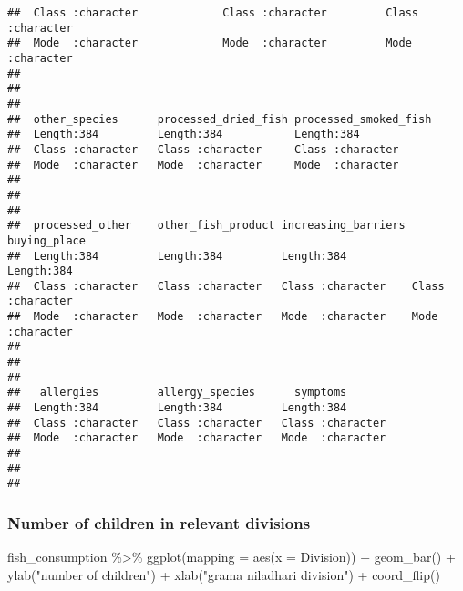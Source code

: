 \documentclass[
]{article}
\newenvironment{Shaded}{\begin{snugshade}}{\end{snugshade}}
\newcommand{\AttributeTok}[1]{\textcolor[rgb]{0.77,0.63,0.00}{#1}}
\newcommand{\FunctionTok}[1]{\textcolor[rgb]{0.00,0.00,0.00}{#1}}
\newcommand{\NormalTok}[1]{#1}
\newcommand{\SpecialCharTok}[1]{\textcolor[rgb]{0.00,0.00,0.00}{#1}}
\newcommand{\StringTok}[1]{\textcolor[rgb]{0.31,0.60,0.02}{#1}}
\begin{document}
\begin{verbatim}
##  Class :character             Class :character         Class :character     
##  Mode  :character             Mode  :character         Mode  :character     
##                                                                             
##                                                                             
##                                                                             
##  other_species      processed_dried_fish processed_smoked_fish
##  Length:384         Length:384           Length:384           
##  Class :character   Class :character     Class :character     
##  Mode  :character   Mode  :character     Mode  :character     
##                                                               
##                                                               
##                                                               
##  processed_other    other_fish_product increasing_barriers buying_place      
##  Length:384         Length:384         Length:384          Length:384        
##  Class :character   Class :character   Class :character    Class :character  
##  Mode  :character   Mode  :character   Mode  :character    Mode  :character  
##                                                                              
##                                                                              
##                                                                              
##   allergies         allergy_species      symptoms        
##  Length:384         Length:384         Length:384        
##  Class :character   Class :character   Class :character  
##  Mode  :character   Mode  :character   Mode  :character  
##                                                          
##                                                          
## 
\end{verbatim}

\hypertarget{number-of-children-in-relevant-divisions}{%
\subsubsection{Number of children in relevant
divisions}\label{number-of-children-in-relevant-divisions}}

\begin{Shaded}
\begin{Highlighting}[]
\NormalTok{fish\_consumption }\SpecialCharTok{\%\textgreater{}\%}
\FunctionTok{ggplot}\NormalTok{(}\AttributeTok{mapping =} \FunctionTok{aes}\NormalTok{(}\AttributeTok{x =}\NormalTok{ Division)) }\SpecialCharTok{+}
\FunctionTok{geom\_bar}\NormalTok{() }\SpecialCharTok{+}
\FunctionTok{ylab}\NormalTok{(}\StringTok{"number of children"}\NormalTok{) }\SpecialCharTok{+}
\FunctionTok{xlab}\NormalTok{(}\StringTok{"grama niladhari division"}\NormalTok{) }\SpecialCharTok{+}
\FunctionTok{coord\_flip}\NormalTok{()}
\end{Highlighting}
\end{Shaded}
\end{document}
